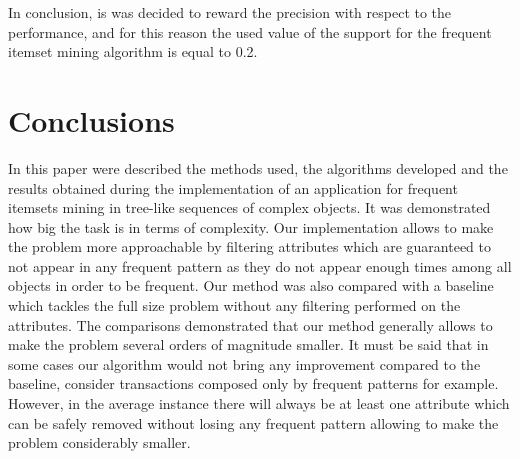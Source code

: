 \documentclass{acm_proc_article-sp-sigmod09}
\begin{document}
In conclusion, is was decided to reward the precision with respect to the performance, and for this reason the used value of the support for the frequent itemset mining algorithm is equal to 0.2.

\section{Conclusions}
In this paper were described the methods used, the algorithms developed and the results obtained during the implementation of an application for frequent itemsets mining in tree-like sequences of complex objects. It was demonstrated how big the task is in terms of complexity. Our implementation allows to make the problem more approachable by filtering attributes which are guaranteed to not appear in any frequent pattern as they do not appear enough times among all objects in order to be frequent. Our method was also compared with a baseline which tackles the full size problem without any filtering performed on the attributes. The comparisons demonstrated that our method generally allows to make the problem several orders of magnitude smaller. It must be said that in some cases our algorithm would not bring any improvement compared to the baseline, consider transactions composed only by frequent patterns for example. However, in the average instance there will always be at least one attribute which can be safely removed without losing any frequent pattern allowing to make the problem considerably smaller.

%

\end{document}
